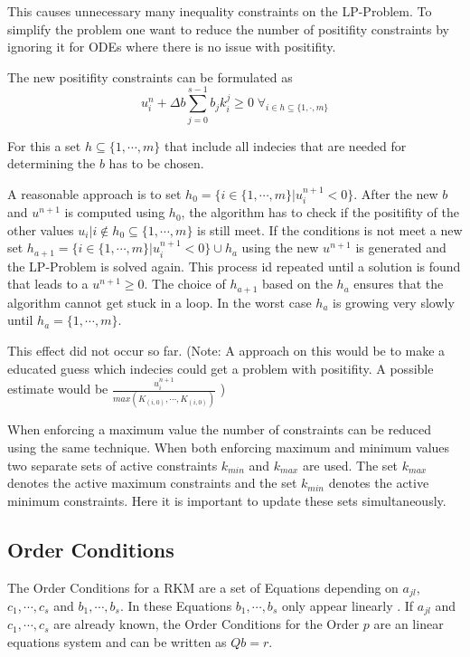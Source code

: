 \documentclass{article}
\begin{document}
This causes unnecessary many inequality constraints on the LP-Problem. To simplify the problem one want to reduce the number of positifity constraints by ignoring it for ODEs where there is no issue with positifity.

The new positifity constraints can be formulated as
\begin{equation}
u_i^n + \Delta b \sum_{j=0}^{s-1} b_j k_i^j  \geq 0   \;   \forall_{i \in h \subseteq \{1,\cdot,m \}} 
\end{equation}

For this a set $h \subseteq \{1,\cdots,m \}$ that include all indecies that are needed for determining the $b$ has to be chosen.

A reasonable approach is to set $h_0 = \{ i \in \{1,\cdots,m \} |  u_i^{n+1}  < 0 \}$. 
After the new $b$ and $u^{n+1}$ is computed using $h_0$, the algorithm has to check if the positifity of the other values $u_i | i \notin h_0 \subseteq \{1,\cdots,m \}$ is still meet. 
If the conditions is not meet a new set $h_{a+1} = \{ i \in \{1,\cdots,m \}|  u_i^{n+1}  < 0 \} \cup h_{a}$ using the new $u^{n+1}$ is generated and the LP-Problem is solved again. This process id repeated until a solution is found that leads to a $u^{n+1} \geq 0$. The choice of $h_{a+1}$ based on the $h_{a}$ ensures that the algorithm cannot get stuck in a loop. In the worst case $h_a$ is growing very slowly until $h_a = \{1,\cdots,m \}$. 

This effect did not occur so far. 
(Note: A approach on this would be to make a educated guess which indecies could get a problem with positifity. A possible estimate would be $\frac{u_i^{n+1}}{max(K_{(i,0)}, \cdots ,K_{(i,0)})} $ )

When enforcing a maximum value the number of constraints can be reduced using the same technique. When both enforcing maximum and minimum values two separate sets of active constraints $k_{min}$ and $k_{max}$ are used. The set $k_{max}$ denotes the active maximum constraints and the set $k_{min}$ denotes the active minimum constraints. 
Here it is important to update these sets simultaneously.  


\subsection{Order Conditions}\label{sec:OrderCond}

The Order Conditions for a RKM are a set of Equations depending on $a_{jl}$, $c_1,\cdots,c_s$ and $b_1,\cdots,b_s$. In these Equations $b_1,\cdots,b_s$ only appear linearly \cite{hairer_runge-kutta_1993}.
If $a_{jl}$ and $c_1,\cdots,c_s$ are already known, the Order Conditions for the Order $p$ are an linear equations system and can be written as $Q b = r$. 
\end{document}
